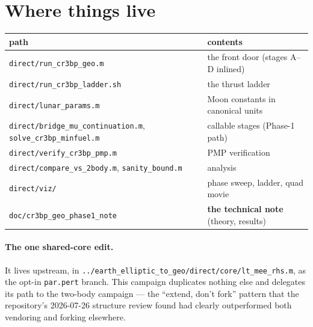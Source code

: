 \documentclass[11pt]{article}
\newcommand{\file}[1]{\texttt{#1}}
\begin{document}
\section{Where things live}

\begin{center}
\begin{tabular}{ll}
\toprule
path & contents \\
\midrule
\file{direct/run\_cr3bp\_geo.m}          & the front door (stages A--D inlined) \\
\file{direct/run\_cr3bp\_ladder.sh}      & the thrust ladder \\
\file{direct/lunar\_params.m}            & Moon constants in canonical units \\
\file{direct/bridge\_mu\_continuation.m}, \file{solve\_cr3bp\_minfuel.m}
                                          & callable stages (Phase-1 path) \\
\file{direct/verify\_cr3bp\_pmp.m}       & PMP verification \\
\file{direct/compare\_vs\_2body.m}, \file{sanity\_bound.m} & analysis \\
\file{direct/viz/}                       & phase sweep, ladder, quad movie \\
\file{doc/cr3bp\_geo\_phase1\_note}      & \textbf{the technical note} (theory, results) \\
\bottomrule
\end{tabular}
\end{center}

\paragraph{The one shared-core edit.} It lives upstream, in
\file{../earth\_elliptic\_to\_geo/direct/core/lt\_mee\_rhs.m}, as the opt-in
\texttt{par.pert} branch. This campaign duplicates nothing else and delegates
its path to the two-body campaign --- the ``extend, don't fork'' pattern that
the repository's 2026-07-26 structure review found had clearly outperformed
both vendoring and forking elsewhere.
\end{document}
